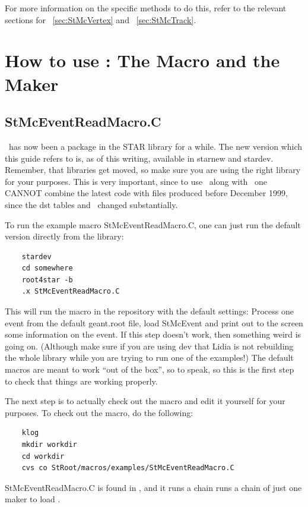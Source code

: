 For more information on the specific methods to do this, refer to the relevant sections for
 ~\ref{sec:StMcVertex} and   ~\ref{sec:StMcTrack}.


\section{How to use \StMcEvent: The Macro and the Maker}
\label{sec:howto}
\subsection{StMcEventReadMacro.C}
\StMcEvent\ has now been a package in the STAR library for a while.  The
new version which this guide refers to is, as of this writing,
available in starnew and stardev.  Remember, that libraries
get moved, so make sure you are using the right library for
your purposes.  This is very important, since to use \StMcEvent\
along with \StEvent\ one CANNOT combine the latest code with
files produced before December 1999, since the dst tables
and \StEvent\ changed substantially.

To run the example macro StMcEventReadMacro.C, one can just
run the default version directly from the library:
\begin{verbatim}
    stardev
    cd somewhere
    root4star -b
    .x StMcEventReadMacro.C
\end{verbatim}
This will run the macro in the repository with the default settings:
Process one event from the default geant.root file, load StMcEvent
and print out to the screen some information on the event.
If this step doesn't work, then something weird is going on.  (Although
make sure if you are using dev that Lidia is not rebuilding the whole
library while you are trying to run one of the examples!)  The
default macros are meant to work ``out of the box'', so to speak,
so this is the first step to check that things are working
properly.

The next step is to actually check out the macro and edit it yourself for
your purposes.  To check out the macro, do the following:
\begin{verbatim}
    klog
    mkdir workdir
    cd workdir
    cvs co StRoot/macros/examples/StMcEventReadMacro.C
\end{verbatim}

StMcEventReadMacro.C is found in
,  %
and it runs a chain runs a chain of just one maker to load \StMcEvent .


